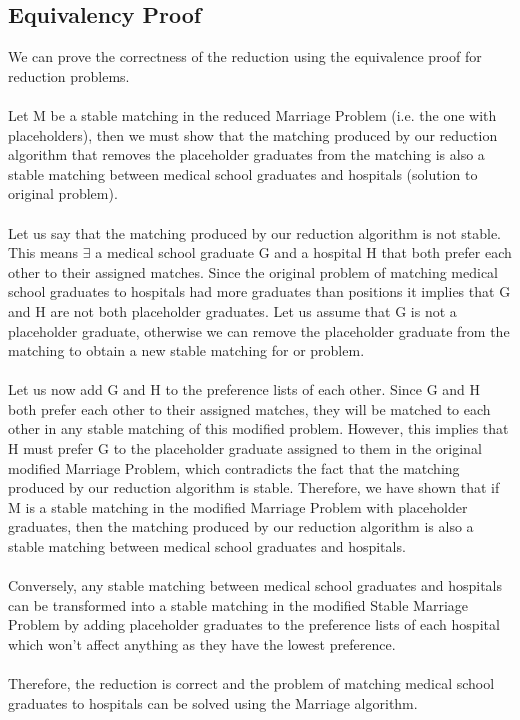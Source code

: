\documentclass{article}
\begin{document}
\subsection{Equivalency Proof}
We can prove the correctness of the reduction using the equivalence proof for reduction problems.\\\\
Let M be a stable matching in the reduced Marriage Problem (i.e. the one with placeholders), then we must show that the matching produced by our reduction algorithm that removes the placeholder graduates from the matching is also a stable matching between medical school graduates and hospitals (solution to original problem).\\\\
Let us say that the matching produced by our reduction algorithm is not stable. This means $\exists$ a medical school graduate G and a hospital H that both prefer each other to their assigned matches. Since the original problem of matching medical school graduates to hospitals had more graduates than positions it implies that G and H are not both placeholder graduates. Let us assume that G is not a placeholder graduate, otherwise we can remove the placeholder graduate from the matching to obtain a new stable matching for or problem.\\\\
Let us now add G and H to the preference lists of each other. Since G and H both prefer each other to their assigned matches, they will be matched to each other in any stable matching of this modified problem. However, this implies that H must prefer G to the placeholder graduate assigned to them in the original modified Marriage Problem, which contradicts the fact that the matching produced by our reduction algorithm is stable. Therefore, we have shown that if M is a stable matching in the modified Marriage Problem with placeholder graduates, then the matching produced by our reduction algorithm is also a stable matching between medical school graduates and hospitals.\\\\ 
Conversely, any stable matching between medical school graduates and hospitals can be transformed into a stable matching in the modified Stable Marriage Problem by adding placeholder graduates to the preference lists of each hospital which won't affect anything as they have the lowest preference. \\\\
Therefore, the reduction is correct and the problem of matching medical school graduates to hospitals can be solved using the Marriage algorithm.
\end{document}
